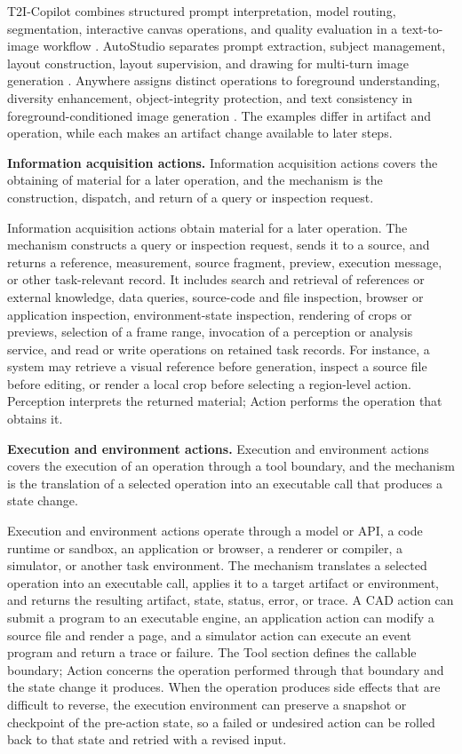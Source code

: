 T2I-Copilot combines structured prompt interpretation, model routing, segmentation, interactive canvas operations, and quality evaluation in a text-to-image workflow \cite{chen2025t2icopilot}. AutoStudio separates prompt extraction, subject management, layout construction, layout supervision, and drawing for multi-turn image generation \cite{cheng2024autostudio}. Anywhere assigns distinct operations to foreground understanding, diversity enhancement, object-integrity protection, and text consistency in foreground-conditioned image generation \cite{xie2024anywhere}. The examples differ in artifact and operation, while each makes an artifact change available to later steps.

\textbf{Information acquisition actions.} Information acquisition actions covers the obtaining of material for a later operation, and the mechanism is the construction, dispatch, and return of a query or inspection request.

Information acquisition actions obtain material for a later operation. The mechanism constructs a query or inspection request, sends it to a source, and returns a reference, measurement, source fragment, preview, execution message, or other task-relevant record. It includes search and retrieval of references or external knowledge, data queries, source-code and file inspection, browser or application inspection, environment-state inspection, rendering of crops or previews, selection of a frame range, invocation of a perception or analysis service, and read or write operations on retained task records. For instance, a system may retrieve a visual reference before generation, inspect a source file before editing, or render a local crop before selecting a region-level action. Perception interprets the returned material; Action performs the operation that obtains it.

\textbf{Execution and environment actions.} Execution and environment actions covers the execution of an operation through a tool boundary, and the mechanism is the translation of a selected operation into an executable call that produces a state change.

Execution and environment actions operate through a model or API, a code runtime or sandbox, an application or browser, a renderer or compiler, a simulator, or another task environment. The mechanism translates a selected operation into an executable call, applies it to a target artifact or environment, and returns the resulting artifact, state, status, error, or trace. A CAD action can submit a program to an executable engine, an application action can modify a source file and render a page, and a simulator action can execute an event program and return a trace or failure. The Tool section defines the callable boundary; Action concerns the operation performed through that boundary and the state change it produces. When the operation produces side effects that are difficult to reverse, the execution environment can preserve a snapshot or checkpoint of the pre-action state, so a failed or undesired action can be rolled back to that state and retried with a revised input.

